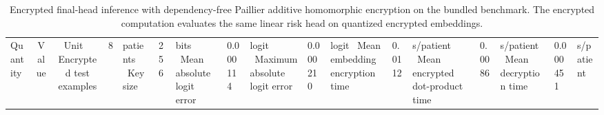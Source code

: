 \begin{table}[t]
\centering
\caption{Encrypted final-head inference with dependency-free Paillier additive homomorphic encryption on the bundled benchmark. The encrypted computation evaluates the same linear risk head on quantized encrypted embeddings.}
\label{tab:crypto_results}
\small
\begin{tabular}{lcc}
\toprule
Quantity & Value & Unit \
\midrule
Encrypted test examples & 8 & patients \
Key size & 256 & bits \
Mean absolute logit error & 0.000114 & logit \
Maximum absolute logit error & 0.000210 & logit \
Mean embedding encryption time & 0.0112 & s/patient \
Mean encrypted dot-product time & 0.0086 & s/patient \
Mean decryption time & 0.000451 & s/patient \
\bottomrule
\end{tabular}
\end{table}